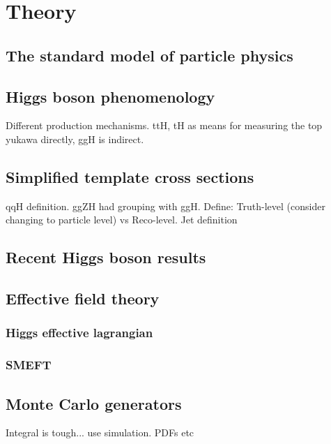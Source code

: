 \chapter{Theory}
\label{chap:theory}

\section{The standard model of particle physics}

\section{Higgs boson phenomenology}
Different production mechanisms. ttH, tH as means for measuring the top yukawa directly, ggH is indirect.

\section{Simplified template cross sections}\label{sec:theory_stxs}
qqH definition. ggZH had grouping with ggH. Define: Truth-level (consider changing to particle level) vs Reco-level. Jet definition

\section{Recent Higgs boson results}

\section{Effective field theory}
\subsection{Higgs effective lagrangian}

\subsection{SMEFT}

\section{Monte Carlo generators}
Integral is tough... use simulation. PDFs etc